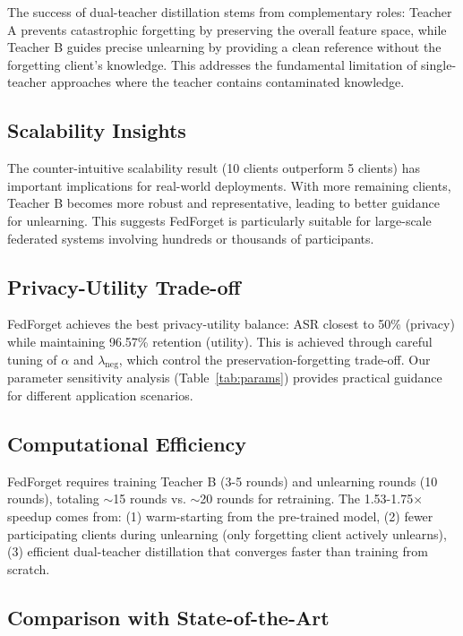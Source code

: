 \documentclass[10pt,twocolumn]{article}
\begin{document}
The success of dual-teacher distillation stems from complementary roles: Teacher A prevents catastrophic forgetting by preserving the overall feature space, while Teacher B guides precise unlearning by providing a clean reference without the forgetting client's knowledge. This addresses the fundamental limitation of single-teacher approaches where the teacher contains contaminated knowledge.

\subsection{Scalability Insights}

The counter-intuitive scalability result (10 clients outperform 5 clients) has important implications for real-world deployments. With more remaining clients, Teacher B becomes more robust and representative, leading to better guidance for unlearning. This suggests FedForget is particularly suitable for large-scale federated systems involving hundreds or thousands of participants.

\subsection{Privacy-Utility Trade-off}

FedForget achieves the best privacy-utility balance: ASR closest to 50\% (privacy) while maintaining 96.57\% retention (utility). This is achieved through careful tuning of $\alpha$ and $\lambda_{\text{neg}}$, which control the preservation-forgetting trade-off. Our parameter sensitivity analysis (Table~\ref{tab:params}) provides practical guidance for different application scenarios.

\subsection{Computational Efficiency}

FedForget requires training Teacher B (3-5 rounds) and unlearning rounds (10 rounds), totaling $\sim$15 rounds vs. $\sim$20 rounds for retraining. The 1.53-1.75$\times$ speedup comes from: (1) warm-starting from the pre-trained model, (2) fewer participating clients during unlearning (only forgetting client actively unlearns), (3) efficient dual-teacher distillation that converges faster than training from scratch.

\subsection{Comparison with State-of-the-Art}
\end{document}
